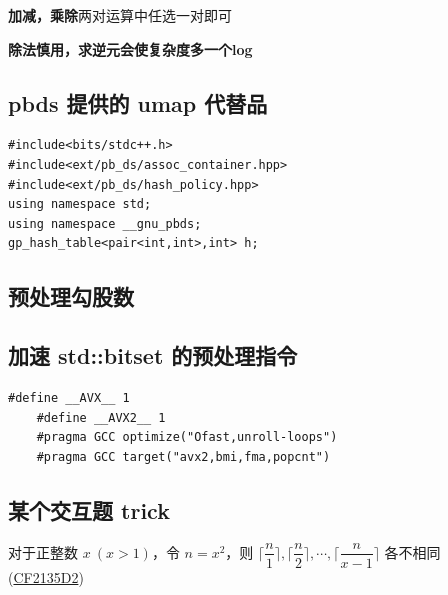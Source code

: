 \documentclass[12pt]{article}
\begin{document}
\textbf{加减，乘除}两对运算中任选一对即可

\textbf{除法慎用，求逆元会使复杂度多一个log}



\newpage

% 
% 
% 
% 

\subsection{pbds 提供的 umap 代替品}

\begin{lstlisting}[style=C++]
#include<bits/stdc++.h>
#include<ext/pb_ds/assoc_container.hpp>
#include<ext/pb_ds/hash_policy.hpp>
using namespace std;
using namespace __gnu_pbds;
gp_hash_table<pair<int,int>,int> h;
\end{lstlisting}

\subsection{预处理勾股数}



\subsection{加速 std::bitset 的预处理指令}

\begin{lstlisting}[style=C++]
	#define __AVX__ 1
	#define __AVX2__ 1
	#pragma GCC optimize("Ofast,unroll-loops")
	#pragma GCC target("avx2,bmi,fma,popcnt")
\end{lstlisting}

\subsection{某个交互题 trick}

对于正整数 $x\ (x>1)$，令 $n=x^2$，则 $\lceil \dfrac{n}{1}\rceil,\lceil \dfrac{n}{2}\rceil,\cdots,\lceil \dfrac{n}{x-1}\rceil$ 各不相同 (\href{https://codeforces.com/contest/2135/problem/D2}{CF2135D2})

\newpage
\end{document}
